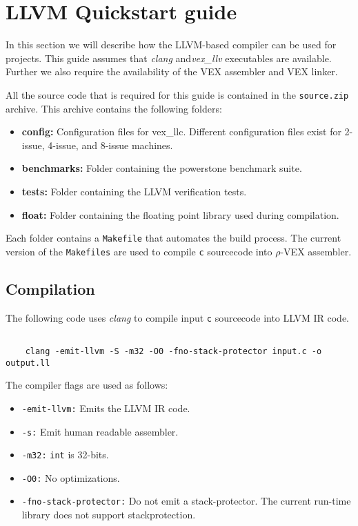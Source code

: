 \chapter{LLVM Quickstart guide}
In this section we will describe how the LLVM-based compiler can be used for projects. This guide assumes that \emph{clang} and\emph{vex\_llv} executables are available. Further we also require the availability of the VEX assembler and VEX linker.

All the source code that is required for this guide is contained in the \texttt{source.zip} archive. This archive contains the following folders:

\begin{itemize}
	\item \textbf{config:} Configuration files for vex\_llc. Different configuration files exist for 2-issue, 4-issue, and 8-issue machines.
	\item \textbf{benchmarks:} Folder containing the powerstone benchmark suite.
	\item \textbf{tests:} Folder containing the LLVM verification tests.
	\item \textbf{float:} Folder containing the floating point library used during compilation.
\end{itemize}

Each folder contains a \texttt{Makefile} that automates the build process. The current version of the \texttt{Makefiles} are used to compile \texttt{c} sourcecode into $\rho$-VEX assembler.

\section{Compilation}
The following code uses \emph{clang} to compile input \texttt{c} sourcecode into LLVM IR code.
\begin{lstlisting}

	clang -emit-llvm -S -m32 -O0 -fno-stack-protector input.c -o output.ll

\end{lstlisting}

The compiler flags are used as follows:

\begin{itemize}
	\item \texttt{-emit-llvm:} Emits the LLVM IR code.
	\item \texttt{-s:} Emit human readable assembler.
	\item \texttt{-m32:} \texttt{int} is 32-bits.
	\item \texttt{-O0:} No optimizations.
	\item \texttt{-fno-stack-protector:} Do not emit a stack-protector. The current run-time library does not support stackprotection.
\end{itemize}

